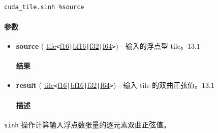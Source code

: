 \documentclass{article}
\begin{document}
\begin{lstlisting}

cuda_tile.sinh %source

\end{lstlisting}



\paragraph{参数}


\begin{itemize}
\item \textbf{source} ( \href{https://docs.nvidia.com/cuda/tile-ir/latest/sections/types.html#type-tile}{tile}\texttt{<}\href{https://docs.nvidia.com/cuda/tile-ir/latest/sections/types.html#subsection-element-types}{f16}\texttt{|}\href{https://docs.nvidia.com/cuda/tile-ir/latest/sections/types.html#subsection-element-types}{bf16}\texttt{|}\href{https://docs.nvidia.com/cuda/tile-ir/latest/sections/types.html#subsection-element-types}{f32}\texttt{|}\href{https://docs.nvidia.com/cuda/tile-ir/latest/sections/types.html#subsection-element-types}{f64}\texttt{>}) - 输入的浮点型 tile。$\boxed{13.1}$




\paragraph{结果}


\item \textbf{result} ( \href{https://docs.nvidia.com/cuda/tile-ir/latest/sections/types.html#type-tile}{tile}\texttt{<}\href{https://docs.nvidia.com/cuda/tile-ir/latest/sections/types.html#subsection-element-types}{f16}\texttt{|}\href{https://docs.nvidia.com/cuda/tile-ir/latest/sections/types.html#subsection-element-types}{bf16}\texttt{|}\href{https://docs.nvidia.com/cuda/tile-ir/latest/sections/types.html#subsection-element-types}{f32}\texttt{|}\href{https://docs.nvidia.com/cuda/tile-ir/latest/sections/types.html#subsection-element-types}{f64}\texttt{>}) - 输入 tile 的双曲正弦值。$\boxed{13.1}$




\paragraph{描述}


\end{itemize}
\texttt{sinh} 操作计算输入浮点数张量的逐元素双曲正弦值。
\end{document}

